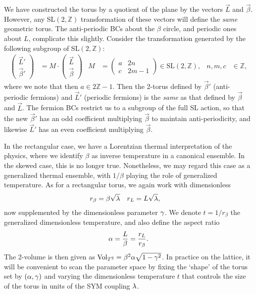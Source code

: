 We have constructed the torus by a quotient of the plane by the vectors $\vec{L}$ and $\vec{\beta}$.
However, any SL$(2, \mathbb{Z})$ transformation of these vectors will define the \emph{same} geometric torus.
The anti-periodic BCs about the $\beta$ circle, and periodic ones about $L$, complicate this slightly.
Consider the transformation generated by the following subgroup of SL$(2, \mathbb{Z})$:
\begin{align}
  \label{eq:SLtransform}
  \left(\begin{array}{c}
    \vec{L}' \\
    \vec{\beta}'
  \end{array}\right) & = M \cdot \left(\begin{array}{c}
    \vec{L} \\
    \vec{\beta}
  \end{array}\right) &
  M & = \left(\begin{array}{cc}
    a & 2n \\
    c & 2m - 1
  \end{array}\right) \in \text{SL}(2, \mathbb{Z}), &
  n, m, c & \in \mathbb{Z},
\end{align}
where we note that then $a \in 2\mathbb{Z} - 1$.
Then the 2-torus defined by $\vec{\beta}'$ (anti-periodic fermions) and $\vec{L}'$ (periodic fermions) is the \emph{same} as that defined by $\vec{\beta}$ and $\vec{L}$.
The fermion BCs restrict us to a subgroup of the full SL action, so that the new $\vec{\beta}'$ has an odd coefficient multiplying $\vec{\beta}$ to maintain anti-periodicity, and likewise $\vec{L}'$ has an even coefficient multiplying $\vec{\beta}$.

In the rectangular case, we have a Lorentzian thermal interpretation of the physics, where we identify $\beta$ as inverse temperature in a canonical ensemble.
In the skewed case, this is no longer true.
Nonetheless, we may regard this case as a generalized thermal ensemble, with $1 / \beta$ playing the role of generalized temperature.
As for a rectangular torus, we again work with dimensionless
\begin{align}
  r_{\beta} & = \beta \sqrt{\lambda} &
  r_L & = L \sqrt{\lambda},
\end{align}
now supplemented by the dimensionless parameter $\gamma$.
We denote $t = 1 / r_{\beta}$ the generalized dimensionless temperature, and also define the aspect ratio
\begin{equation}
  \alpha = \frac{L}{\beta} = \frac{r_L}{r_{\beta}}.
\end{equation}
The 2-volume is then given as $\text{Vol}_{T^2} = \beta^2 \alpha \sqrt{1 - \gamma^2}$.
In practice on the lattice, it will be convenient to scan the parameter space by fixing the `shape' of the torus set by $(\alpha, \gamma)$ and varying the dimensionless temperature $t$ that controls the size of the torus in units of the SYM coupling $\lambda$.

